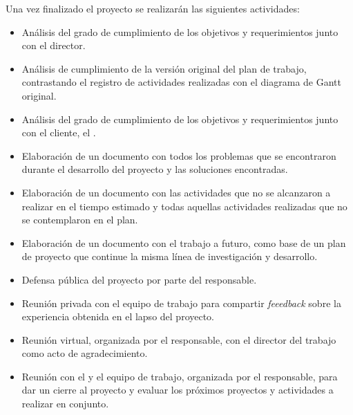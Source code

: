 \documentclass[
11pt, %
codirector, %
]{charter}
\begin{document}
Una vez finalizado el proyecto se realizarán las siguientes actividades:
\begin{itemize}
	\item Análisis del grado de cumplimiento de los objetivos y requerimientos junto con el director.
	\item Análisis de cumplimiento de la versión original del plan de trabajo, contrastando el registro de actividades realizadas con el diagrama de Gantt original.
	\item Análisis del grado de cumplimiento de los objetivos y requerimientos junto con el cliente, el \clientename{}.
	\item Elaboración de un documento con todos los problemas que se encontraron durante el desarrollo del proyecto y las soluciones encontradas.
	\item Elaboración de un documento con las actividades que no se alcanzaron a realizar en el tiempo estimado y todas aquellas actividades realizadas que no se contemplaron en el plan.
	\item Elaboración de un documento con el trabajo a futuro, como base de un plan de proyecto que continue la misma línea de investigación y desarrollo.
	\item Defensa pública del proyecto por parte del responsable.
	\item Reunión privada con el equipo de trabajo para compartir \textit{feeedback} sobre la experiencia obtenida en el lapso del proyecto.
	\item Reunión virtual, organizada por el responsable, con el director del trabajo como acto de agradecimiento.
	\item Reunión con el \clientename{} y el equipo de trabajo, organizada por el responsable, para dar un cierre al proyecto y evaluar los próximos proyectos y actividades a realizar en conjunto.
\end{itemize}
\end{document}
